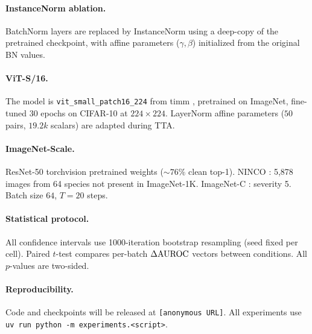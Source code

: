 \paragraph{InstanceNorm ablation.}
BatchNorm layers are replaced by InstanceNorm using a deep-copy of the pretrained checkpoint, with affine parameters ($\gamma, \beta$) initialized from the original BN values.

\paragraph{ViT-S/16.}
The model is \texttt{vit\_small\_patch16\_224} from timm \citep{timm}, pretrained on ImageNet, fine-tuned 30 epochs on CIFAR-10 at $224 \times 224$.
LayerNorm affine parameters ($50$ pairs, $19.2k$ scalars) are adapted during TTA.

\paragraph{ImageNet-Scale.}
ResNet-50 torchvision pretrained weights ($\sim 76\%$ clean top-1).
NINCO \citep{ninco}: 5,878 images from 64 species not present in ImageNet-1K.
ImageNet-C \citep{imagenetc}: severity 5.
Batch size $64$, $T=20$ steps.

\paragraph{Statistical protocol.}
All confidence intervals use 1000-iteration bootstrap resampling (seed fixed per cell).
Paired $t$-test compares per-batch $\Delta\text{AUROC}$ vectors between conditions.
All $p$-values are two-sided.

\paragraph{Reproducibility.}
Code and checkpoints will be released at \texttt{[anonymous URL]}.
All experiments use \texttt{uv run python -m experiments.<script>}.
